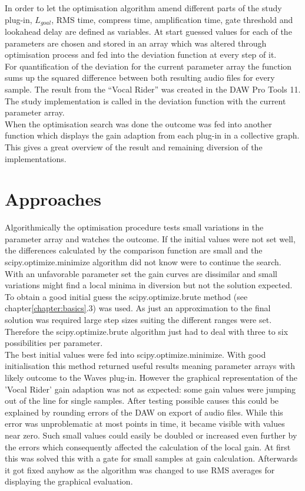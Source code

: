 In order to let the optimisation algorithm amend different parts of the study plug-in, $L_{goal}$, RMS time, compress time, amplification time, gate threshold and lookahead delay are defined as variables. At start guessed values for each of the parameters are chosen and stored in an array which was altered through optimisation process and fed into the deviation function at every step of it.\\
For quantification of the deviation for the current parameter array the function sums up the squared difference between both resulting audio files for every sample. The result from the “Vocal Rider” was created in the DAW Pro Tools 11. The study implementation is called in the deviation function with the current parameter array.\\
When the optimisation search was done the outcome was fed into another function which displays the gain adaption from each plug-in in a collective graph. This gives a great overview of the result and remaining diversion of the implementations.\\

\section{Approaches}

Algorithmically the optimisation procedure tests small variations in the parameter array and watches the outcome. If the initial values were not set well, the differences calculated by the comparison function are small and the scipy.optimize.minimize algorithm did not know were to continue the search. With an unfavorable parameter set the gain curves are dissimilar and small variations might find a local minima in diversion but not the solution expected.\\
To obtain a good initial guess the scipy.optimize.brute method (see chapter\ref{chapter:basics}.3) was used. As just an approximation to the final solution was required large step sizes suiting the different ranges were set. Therefore the scipy.optimize.brute algorithm just had to deal with three to six possibilities per parameter.\\
The best initial values were fed into scipy.optimize.minimize. With good initialisation this method returned useful results meaning parameter arrays with likely outcome to the Waves plug-in. However the graphical representation of the 'Vocal Rider' gain adaption was not as expected: some gain values were jumping out of the line for single samples. After testing possible causes this could be explained by rounding errors of the DAW on export of audio files. While this error was unproblematic at most points in time, it became visible with values near zero. Such small values could easily be doubled or increased even further by the errors which consequently affected the calculation of the local gain. At first this was solved this with a gate for small samples at gain calculation. Afterwards it got fixed anyhow as the algorithm was changed to use RMS averages for displaying the graphical evaluation.\\


